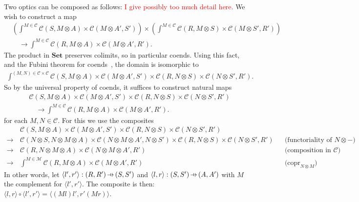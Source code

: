 \documentclass[11pt,a4paper]{article}
\theoremstyle{plain}
\theoremstyle{definition}
\newcommand{\C}{\mathscr{C}}
\newcommand{\M}{\mathscr{M}}
\newcommand{\Set}{\mathbf{Set}}
\DeclareMathOperator{\copr}{copr}
\newcommand{\hto}{\ensuremath{\,\mathaccent\shortmid\rightarrow\,}}
\newcommand{\todo}[1]{\textcolor{red}{\small #1}}
\begin{document}
Two optics can be composed as follows: \todo{I give possibly too much detail here.} We wish to construct a map
\begin{align*}
  &\left(\int^{M \in \C} \C(S, M \otimes A) \times \C(M \otimes A', S')\right) \times \left(\int^{M \in \C} \C(R, M \otimes S) \times \C(M \otimes S', R')\right) \\ &
                                                                                                                                                                       \quad \to \int^{M \in \C} \C(R, M \otimes A) \times \C(M \otimes A', R').
\end{align*}
The product in $\Set$ preserves colimits, so in particular coends. Using this fact, and the Fubini theorem for coends~\cite[Remark 1.9]{CoendCofriend}, the domain is isomorphic to
\begin{align*}
  \int^{(M, N) \in \C \times \C} \C(S, M \otimes A) \times \C(M \otimes A', S') \times \C(R, N \otimes S) \times \C(N \otimes S', R').
\end{align*}
So by the universal property of coends, it suffices to construct natural maps
\begin{align*}
  & \C(S, M \otimes A) \times \C(M \otimes A', S') \times \C(R, N \otimes S) \times \C(N \otimes S', R') \\ &
                                                                                                              \quad \to \int^{M \in \C} \C(R, M \otimes A) \times \C(M \otimes A', R').
\end{align*}
for each $M, N \in \C$. For this we use the composites
\begin{align*}
  &\C(S, M \otimes A) \times \C(M \otimes A', S') \times \C(R, N \otimes S) \times \C(N \otimes S', R')\\
  \to \,& \C(N \otimes S, N \otimes M \otimes A) \times \C(N \otimes M \otimes A', N \otimes S') \times \C(R, N \otimes S) \times \C(N \otimes S', R') && \text{(functoriality of $N \otimes  -$)} \\
  \to \,& \C(R, N \otimes  M \otimes A) \times \C(N \otimes M \otimes A', R') && \text{(composition in $\C$)} \\
  \to \,&\int^{M \in \M} \C(R, M \otimes A) \times \C(M \otimes A', R') && \text{($\copr_{N \otimes M}$)}
\end{align*}
In other words, let $\langle l', r' \rangle : (R, R') \hto (S, S')$ and $\langle l, r \rangle : (S, S') \hto (A, A')$ with $M$ the complement for $\langle l', r' \rangle$. The composite is then: $\langle l, r \rangle \circ \langle l', r' \rangle = \langle (M l)l', r'(Mr)\rangle$.
\end{document}
